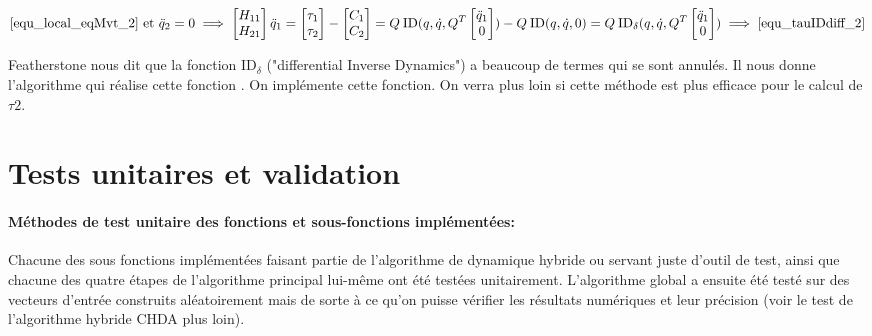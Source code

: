 \documentclass{report}
\begin{document}
\begin{align*}
\ref{equ_local_eqMvt_2} \textnormal{ et } \ddot{q}_2 = 0 \implies 
\begin{bmatrix}
  H_{11} \\
  H_{21}
\end{bmatrix} \ddot{q}_1
=
\begin{bmatrix}
  \tau_1 \\
  \tau_2
\end{bmatrix}
-
\begin{bmatrix}
  C_1 \\
  C_2
\end{bmatrix}
=
Q \: \mathrm{ID}(q,\dot{q},Q^T\begin{bmatrix}
                                \ddot{q}_1 \\      
                                0         
                              \end{bmatrix}) - Q \: \mathrm{ID}(q,\dot{q},0) 
=
Q \: \mathrm{ID}_{\delta}(q,\dot{q},Q^T\begin{bmatrix}
                                         \ddot{q}_1 \\      
                                         0         
                                       \end{bmatrix}) \implies \ref{equ_tauIDdiff_2}
\end{align*} 

Featherstone nous dit \cite[p103]{bib_featherstone} que la fonction $\mathrm{ID}_{\delta}$ ("differential Inverse Dynamics") a beaucoup de termes qui se sont annulés. Il nous donne l'algorithme qui réalise cette fonction \cite[p104]{bib_featherstone}. On implémente cette fonction. On verra plus loin si cette méthode est plus efficace pour le calcul de $\tau2$.


\section{Tests unitaires et validation}

\paragraph{Méthodes de test unitaire des fonctions et sous-fonctions implémentées:}

Chacune des sous fonctions implémentées faisant partie de l'algorithme de dynamique hybride ou servant juste d'outil de test, ainsi que chacune des quatre étapes de l'algorithme principal lui-même ont été testées unitairement. L'algorithme global a ensuite été testé sur des vecteurs d'entrée construits aléatoirement mais de sorte à ce qu'on puisse vérifier les résultats numériques et leur précision (voir le test de l'algorithme hybride CHDA plus loin).
\end{document}

